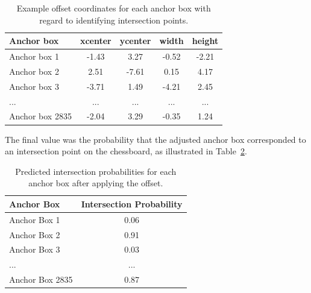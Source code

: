 \begin{table}[h]
    \centering
    \caption[Offset values for anchor box (intersection points)]{Example offset coordinates for each anchor box with regard to identifying intersection points.}  %
    \renewcommand{\arraystretch}{1.3} %
    \begin{tabular}{lcccc}
        \toprule
        \textbf{Anchor box} & \textbf{xcenter} & \textbf{ycenter} & \textbf{width} & \textbf{height} \\
        \midrule
        Anchor box 1 & -1.43 & 3.27 & -0.52 & -2.21 \\
        Anchor box 2 & 2.51 & -7.61 & 0.15 & 4.17 \\
        Anchor box 3 & -3.71 & 1.49 & -4.21 & 2.45 \\
        ... & ... & ... & ... & ... \\
        Anchor box 2835 & -2.04 & 3.29 & -0.35 & 1.24 \\
        \bottomrule
    \end{tabular}
    \label{tab:corner-offset-table}
\end{table}

The final value was the probability that the adjusted anchor box corresponded to an intersection point on the chessboard, as illustrated in Table~\ref{tab:corner-probability-table}. \\

\begin{table}[h]
    \centering
    \caption[Predicted intersection points after applying offset]{Predicted intersection probabilities for each anchor box after applying the offset.}
    \renewcommand{\arraystretch}{1.3}
    \begin{tabular}{lc}
        \toprule
        \textbf{Anchor Box} & \textbf{Intersection Probability} \\
        \midrule
        Anchor Box 1 & 0.06 \\
        Anchor Box 2 & 0.91 \\
        Anchor Box 3 & 0.03 \\
        ... & ... \\
        Anchor Box 2835 & 0.87 \\
        \bottomrule
    \end{tabular}
    \label{tab:corner-probability-table}
\end{table}




